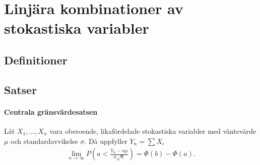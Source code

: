 \section{Linjära kombinationer av stokastiska variabler}

\subsection{Definitioner}

\subsection{Satser}

\paragraph{Centrala gränsvärdesatsen}
Låt $X_1, \dots, X_n$ vara oberoende, likafördelade stokastiska variabler med väntevärde $\mu$ och standardavvikelse $\sigma$. Då uppfyller $Y_n = \sum X_i$
\begin{align*}
	\lim\limits_{n\to\infty}P\left(a < \frac{Y_n - n\mu}{\sigma\sqrt{n}}\right) = \Phi(b) - \Phi(a).
\end{align*}